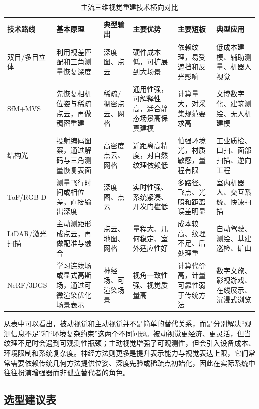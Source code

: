 \documentclass[12pt,a4paper]{ctexart}
\begin{document}
\begin{table}[H]
\centering
\small
\caption{主流三维视觉重建技术横向对比}
\begin{tabularx}{\textwidth}{>{\raggedright\arraybackslash}p{1.9cm} >{\raggedright\arraybackslash}p{2.8cm} >{\raggedright\arraybackslash}p{1.9cm} >{\raggedright\arraybackslash}p{2.1cm} >{\raggedright\arraybackslash}p{2.1cm} X}
\toprule
技术路线 & 基本原理 & 典型输出 & 主要优势 & 主要短板 & 典型应用 \\
\midrule
双目/多目立体 & 利用视差匹配和三角测量恢复深度 & 深度图、点云 & 硬件成本低，可扩展到大场景 & 依赖纹理，易受遮挡和反光影响 & 低成本建模、辅助测量、机器人视觉 \\
SfM+MVS & 先恢复相机位姿与稀疏点云，再做稠密重建 & 稀疏/稠密点云、网格 & 通用性强，可解释性高，适合静态场景高保真建模 & 计算量大，对采集规范要求高 & 文博数字化、建筑测绘、无人机建模 \\
结构光 & 投射编码图案，通过解码与三角测量恢复表面 & 高密度点云、网格 & 近距离高精度，对自然纹理依赖低 & 怕强环境光，材质敏感，量程有限 & 工业质检、口扫、面部扫描、逆向工程 \\
ToF/RGB-D & 测量飞行时间或相位差，直接输出深度 & 深度图、点云 & 实时性强、系统紧凑、开发门槛低 & 多路径、飞点、光照和距离误差明显 & 室内机器人、交互系统、快速扫描 \\
LiDAR/激光扫描 & 主动测距形成点云，再做配准与融合 & 点云、地图、网格 & 量程大、几何稳定、室外适应性好 & 成本较高、纹理不足、后处理重 & 自动驾驶、测绘、基建巡检、矿山 \\
NeRF/\allowbreak 3DGS & 学习连续场或显式高斯场，通过可微渲染优化场景表示 & 神经场、可渲染场景 & 视角一致性强、视觉质量高 & 计算代价高，计量可靠性弱于传统方法 & 数字文旅、影视游戏、在线展示、沉浸式浏览 \\
\bottomrule
\end{tabularx}
\end{table}

从表中可以看出，被动视觉和主动视觉并不是简单的替代关系，而是分别解决“观测信息不足”和“环境复杂约束”这两个不同问题。被动视觉更经济、更灵活，但当纹理不足时会遇到可观测性瓶颈；主动视觉增强了可观测性，但会引入设备成本、环境限制和系统复杂度。神经方法则更多是提升表示能力与视觉表达上限，它们常常需要依赖传统几何方法提供位姿、深度先验或稀疏点初始化，因此在实际系统中往往扮演增强器而非孤立替代者的角色。

\subsection{选型建议表}
\end{document}
